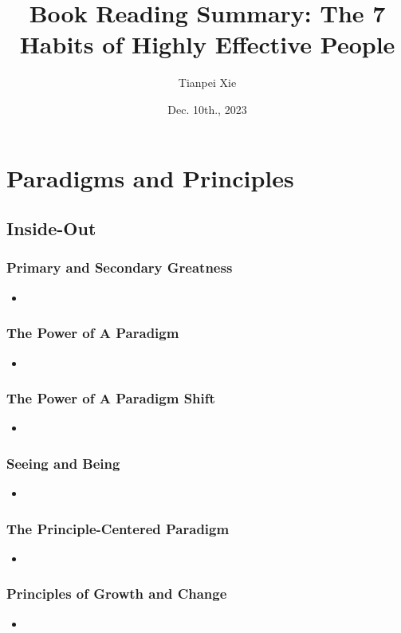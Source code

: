 \documentclass[11pt]{article}
\begin{document}
\title{Book Reading Summary: The 7 Habits of Highly Effective People}
\author{ Tianpei Xie}
\date{Dec. 10th., 2023}
\maketitle
\tableofcontents
\newpage
\section{Paradigms and Principles}
\subsection{Inside-Out}
\subsubsection{Primary and Secondary Greatness}
\begin{itemize}
\item 
\end{itemize}
\subsubsection{The Power of A Paradigm}
\begin{itemize}
\item 
\end{itemize}
\subsubsection{The Power of A Paradigm Shift}
\begin{itemize}
\item 
\end{itemize}
\subsubsection{Seeing and Being}
\begin{itemize}
\item 
\end{itemize}
\subsubsection{The Principle-Centered Paradigm}
\begin{itemize}
\item 
\end{itemize}
\subsubsection{Principles of Growth and Change}
\begin{itemize}
\item 
\end{itemize}
\end{document}
